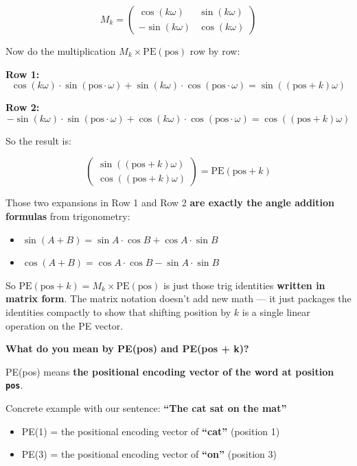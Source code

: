 \[
M_k = \begin{pmatrix} \cos(k\omega) & \sin(k\omega) \\ -\sin(k\omega) & \cos(k\omega) \end{pmatrix}
\]

Now do the multiplication $M_k \times \text{PE}(\text{pos})$ row by row:

\textbf{Row 1:}
\[
\cos(k\omega) \cdot \sin(\text{pos} \cdot \omega) + \sin(k\omega) \cdot \cos(\text{pos} \cdot \omega) = \sin((\text{pos}+k)\omega)
\]

\textbf{Row 2:}
\[
-\sin(k\omega) \cdot \sin(\text{pos} \cdot \omega) + \cos(k\omega) \cdot \cos(\text{pos} \cdot \omega) = \cos((\text{pos}+k)\omega)
\]

So the result is:

\[
\begin{pmatrix} \sin((\text{pos}+k)\omega) \\ \cos((\text{pos}+k)\omega) \end{pmatrix} = \text{PE}(\text{pos} + k)
\]

Those two expansions in Row 1 and Row 2 \textbf{are exactly the angle addition formulas} from trigonometry:
\begin{itemize}
  \item $\sin(A+B) = \sin A \cdot \cos B + \cos A \cdot \sin B$
  \item $\cos(A+B) = \cos A \cdot \cos B - \sin A \cdot \sin B$
\end{itemize}

So $\text{PE}(\text{pos} + k) = M_k \times \text{PE}(\text{pos})$ is just those trig identities \textbf{written in matrix form}. The matrix notation doesn't add new math --- it just packages the identities compactly to show that shifting position by $k$ is a single linear operation on the PE vector.

\bigskip

\textbf{What do you mean by PE(pos) and PE(pos + k)?}

PE(pos) means \textbf{the positional encoding vector of the word at position \texttt{pos}}.

Concrete example with our sentence: \textbf{``The cat sat on the mat''}

\begin{itemize}
  \item PE(1) = the positional encoding vector of \textbf{``cat''} (position 1)
  \item PE(3) = the positional encoding vector of \textbf{``on''} (position 3)
\end{itemize}

